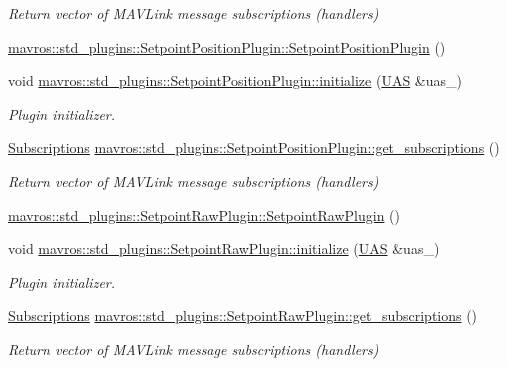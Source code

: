 \begin{DoxyCompactItemize}
\begin{DoxyCompactList}\small\item\em Return vector of M\+A\+V\+Link message subscriptions (handlers) \end{DoxyCompactList}\item 
\mbox{\hyperlink{group__plugin_ga79d0cd0249bfbbcb1d98e6e938a95f5a}{mavros\+::std\+\_\+plugins\+::\+Setpoint\+Position\+Plugin\+::\+Setpoint\+Position\+Plugin}} ()
\item 
void \mbox{\hyperlink{group__plugin_ga2bc831f4a3bdab8f284ead3bbc761181}{mavros\+::std\+\_\+plugins\+::\+Setpoint\+Position\+Plugin\+::initialize}} (\mbox{\hyperlink{classmavros_1_1UAS}{U\+AS}} \&uas\+\_\+)
\begin{DoxyCompactList}\small\item\em Plugin initializer. \end{DoxyCompactList}\item 
\mbox{\hyperlink{group__plugin_ga8967d61fc77040e0c3ea5a4585d62a09}{Subscriptions}} \mbox{\hyperlink{group__plugin_ga99aff69e854142f0373ec4acb5ac726d}{mavros\+::std\+\_\+plugins\+::\+Setpoint\+Position\+Plugin\+::get\+\_\+subscriptions}} ()
\begin{DoxyCompactList}\small\item\em Return vector of M\+A\+V\+Link message subscriptions (handlers) \end{DoxyCompactList}\item 
\mbox{\hyperlink{group__plugin_ga6963f8398466a36a1ecd8669d8bd315c}{mavros\+::std\+\_\+plugins\+::\+Setpoint\+Raw\+Plugin\+::\+Setpoint\+Raw\+Plugin}} ()
\item 
void \mbox{\hyperlink{group__plugin_gaf4feaba098393f1b9f496e7ab47781a3}{mavros\+::std\+\_\+plugins\+::\+Setpoint\+Raw\+Plugin\+::initialize}} (\mbox{\hyperlink{classmavros_1_1UAS}{U\+AS}} \&uas\+\_\+)
\begin{DoxyCompactList}\small\item\em Plugin initializer. \end{DoxyCompactList}\item 
\mbox{\hyperlink{group__plugin_ga8967d61fc77040e0c3ea5a4585d62a09}{Subscriptions}} \mbox{\hyperlink{group__plugin_ga7010ce8f4de96dae39a8dd9a0de4246e}{mavros\+::std\+\_\+plugins\+::\+Setpoint\+Raw\+Plugin\+::get\+\_\+subscriptions}} ()
\begin{DoxyCompactList}\small\item\em Return vector of M\+A\+V\+Link message subscriptions (handlers) \end{DoxyCompactList}\item 

\end{DoxyCompactItemize}
